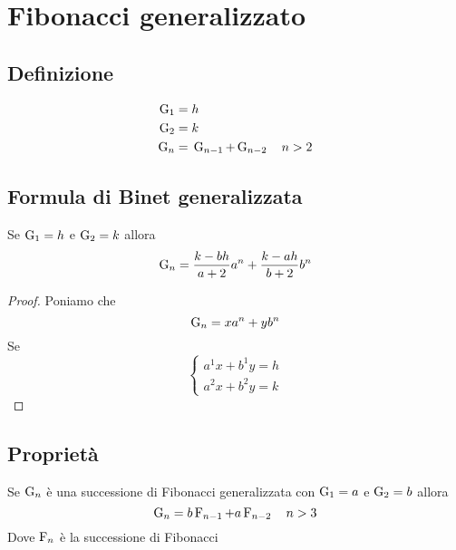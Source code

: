 \chapter{Fibonacci generalizzato}
\section{Definizione}
\begin{defn}
	\begin{align}
		\operatorname{G}_{1}={}&h\notag\\
		\operatorname{G}_{2}={}&k\notag\\
		\operatorname{G}_{n}={}&\operatorname{G}_{n-1}+\operatorname{G}_{n-2}\quad n>2\label{eqn:FiboGendef}
	\end{align}
\end{defn}
\section{Formula di Binet generalizzata}
\begin{thm}
Se $\operatorname{G}_{1}={}h$ e $\operatorname{G}_{2}={}k$ allora \begin{equation}
	\operatorname{G}_{n}={}\dfrac{k-bh}{a+2}a^n+\dfrac{k-ah}{b+2}b^n
\end{equation}\label{eqn:FormulaBinetgeneralizzata}
\end{thm}
\begin{proof}
Poniamo che \begin{equation}
	\operatorname{G}_{n}=xa^n+yb^n
\end{equation} Se
\begin{equation}
	\left\{
	\begin{array}{l}
		a^1x+b^1y=h\\ a^2x+b^2y=k
	\end{array}
	\right.
\end{equation}
\end{proof}
\section{Proprietà}
\begin{thm}[Derivazione]
	Se $\operatorname{G}_{n}$ è una successione di Fibonacci generalizzata  con $\operatorname{G}_{1}=a$ e $\operatorname{G}_{2}=b$ allora
	\begin{equation}
		\operatorname{G}_{n}=b\operatorname{F}_{n-1}+a\operatorname{F}_{n-2}\quad n>3
	\end{equation}\label{thm:FibGenDer}
	Dove $\operatorname{F}_{n}$ è la successione di Fibonacci
\end{thm}